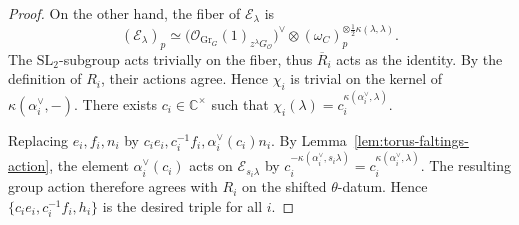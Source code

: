 \documentclass{amsart}
\numberwithin{equation}{section}
\numberwithin{figure}{section}
\theoremstyle{definition}
\theoremstyle{remark}
\renewcommand{\c}[1]{\mathcal{#1}}
\renewcommand{\b}[1]{\mathbb{#1}}
\renewcommand{\r}[1]{\mathrm{#1}}
\newcommand{\SL}{\r{SL}}
\begin{document}
\begin{proof}
	On the other hand, the fiber of \(\mathcal E_\lambda\) is
	\[
	(\mathcal E_\lambda)_p
	\simeq
	\bigl(\mathcal O_{\mathrm{Gr}_G}(1)_{z^\lambda G_{\mathcal O}}\bigr)^\vee
	\otimes
	(\omega_C)_p^{\otimes\frac12\kappa(\lambda,\lambda)}.
	\]
	The $\SL_2$-subgroup acts trivially on the fiber, thus \(\overline R_i\) acts as the identity. By the definition of $R_i$, their actions agree. Hence $\chi_i$ is trivial on the kernel of
	$\kappa(\alpha_i^\vee,-)$.
	There exists $c_i\in\b C^\times$ such that $\chi_i(\lambda)
	=c_i^{\kappa(\alpha_i^\vee,\lambda)}.$
	
	Replacing $e_i, f_i, n_i$ by $c_i e_i, c_i^{-1}f_i, \alpha_i^\vee(c_i)n_i$.
	By Lemma~\ref{lem:torus-faltings-action},
	the element $\alpha_i^\vee(c_i)$ acts on
	$\c E_{s_i\lambda}$ by
	$c_i^{-\kappa(\alpha_i^\vee,s_i\lambda)}
	=c_i^{\kappa(\alpha_i^\vee,\lambda)}.$
	The resulting group action therefore agrees with
	$R_i$ on the shifted $\theta$-datum. Hence $\{c_i e_i, c_i^{-1}f_i, h_i\}$ is the desired triple for all $i$.
\end{proof}




\end{document}
